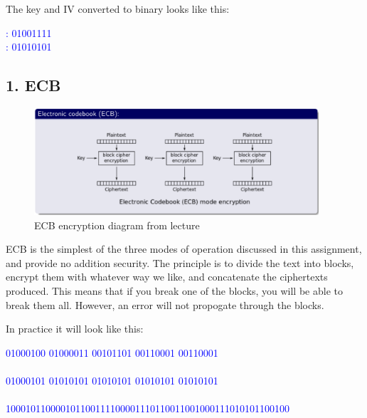\documentclass{article}
\begin{document}
The key and IV converted to binary looks like this: 
\begin{tcolorbox}
\begin{center}
\textcolor{blue}{
: 01001111\\
: 01010101}
\end{center}
\end{tcolorbox}




\subsection{1. ECB}

\begin{figure}[H]
 \centering
  \includegraphics[width=300pt]{img/ecbLecture.png}
 \caption{ECB encryption diagram from lecture}
 \end{figure}


ECB is the simplest of the three modes of operation discussed in this assignment, and provide no addition security. The principle is to divide the text into blocks, encrypt them with whatever way we like, and concatenate the ciphertexts produced. This means that if you break one of the blocks, you will be able to break them all. However, an error will not propogate through the blocks. 

In practice it will look like this:

\begin{scriptsize}
\begin{tcolorbox}
\begin{center}
\textcolor{blue}{
 01000100 01000011 00101101 00110001 00110001\\
\\
01000101 01010101 01010101 01010101 01010101\\
\makebox[1.5cm]{\textbf{=}}\\
100010110000101100111100001110110011001000111010101100100
}

\end{center}
\end{tcolorbox}
\end{scriptsize}
\end{document}

